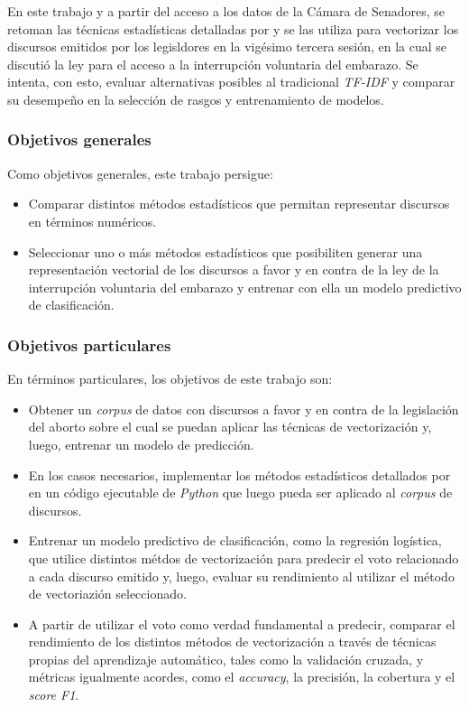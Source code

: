 En este trabajo y a partir del acceso a los datos de la C\'amara de Senadores,
se retoman las t\'ecnicas estad\'isticas detalladas por
\citeauthor{monroe2008fightin} y se las utiliza para vectorizar los
discursos emitidos por los legisldores en la vig\'esimo tercera sesi\'on,
en la cual se discuti\'o la ley para el acceso a
la interrupci\'on voluntaria del embarazo.
Se intenta, con esto, evaluar alternativas posibles al tradicional \textit{TF-IDF}
y comparar su desempeño en la selecci\'on de rasgos y entrenamiento de modelos.

\subsubsection{Objetivos generales}

Como objetivos generales, este trabajo persigue:

\begin{itemize}
    \item{Comparar distintos m\'etodos estad\'isticos que permitan representar
    discursos en t\'erminos num\'ericos.}
    \item{Seleccionar uno o m\'as m\'etodos estad\'isticos que posibiliten
    generar una representaci\'on vectorial de los discursos a favor y en
    contra de la ley de la interrupci\'on voluntaria del embarazo y entrenar
    con ella un modelo predictivo de clasificaci\'on.}
\end{itemize}

\subsubsection{Objetivos particulares}

En t\'erminos particulares, los objetivos de este trabajo son:

\begin{itemize}
    \item{Obtener un \textit{corpus} de datos con discursos a favor y en contra
    de la legislaci\'on del aborto sobre el cual se puedan aplicar las t\'ecnicas de
    vectorizaci\'on y, luego, entrenar un modelo de predicci\'on.}
    \item{En los casos necesarios, implementar los m\'etodos estad\'isticos detallados
    por \cite{monroe2008fightin} en un c\'odigo ejecutable de \textit{Python} que
    luego pueda ser aplicado al \textit{corpus} de discursos.}
    \item{Entrenar un modelo predictivo de clasificaci\'on, como la regresi\'on log\'istica,
    que utilice distintos m\'etdos de vectorizaci\'on para predecir el voto relacionado
    a cada discurso emitido y, luego, evaluar su rendimiento al utilizar
    el m\'etodo de vectoriazi\'on seleccionado.}
    \item{A partir de utilizar el voto como verdad fundamental a predecir,
    comparar el rendimiento de los distintos m\'etodos de vectorizaci\'on
    a trav\'es de t\'ecnicas propias del aprendizaje autom\'atico, tales como
    la validaci\'on cruzada, y m\'etricas igualmente acordes, como el
    \textit{accuracy}, la precisi\'on, la cobertura y el \textit{score F1}.}
\end{itemize}
